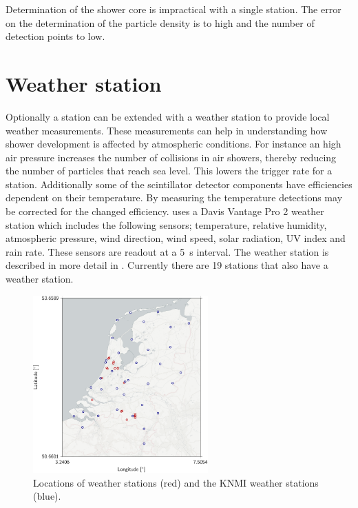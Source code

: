Determination of the shower core is impractical with a single station. The error on the determination of the particle density is to high and the number of detection points to low.

\section{Weather station}

Optionally a \hisparc station can be extended with a weather station to provide local weather measurements. These measurements can help in understanding how shower development is affected by atmospheric conditions. For instance an high air pressure increases the number of collisions in air showers, thereby reducing the number of particles that reach sea level. This lowers the trigger rate for a station. Additionally some of the scintillator detector components have efficiencies dependent on their temperature. By measuring the temperature detections may be corrected for the changed efficiency. \hisparc uses a Davis Vantage Pro 2 weather station \cite{davis2012vantagepro} which includes the following sensors; temperature, relative humidity, atmospheric pressure, wind direction, wind speed, solar radiation, UV index and rain rate. These sensors are readout at a \SI{5}{\second} interval. The weather station is described in more detail in \cite{devries2012weather}. Currently there are 19 \hisparc stations that also have a weather station.

\begin{figure}
    \centering
    \includegraphics[width=0.6\textwidth]
                    {plots/station/map_weather_knmi}
    \caption{Locations of \hisparc weather stations (red) and the KNMI weather stations (blue).}
    \label{fig:map_weather_knmi}
\end{figure}

